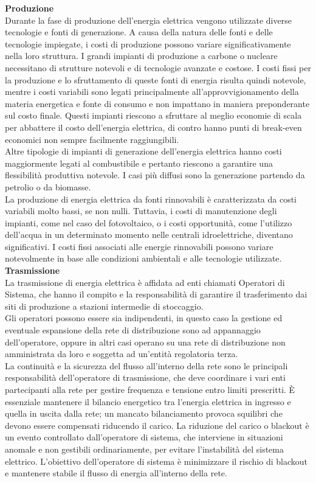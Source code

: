 \documentclass{article}
\begin{document}
\textbf{Produzione}\\
Durante la fase di produzione dell'energia elettrica vengono utilizzate diverse tecnologie e fonti di generazione. A causa della natura delle fonti e delle tecnologie impiegate, i costi di produzione possono variare significativamente nella loro struttura. I grandi impianti di produzione a carbone o nucleare necessitano di strutture notevoli e di tecnologie avanzate e costose. I costi fissi per la produzione e lo sfruttamento di queste fonti di energia risulta quindi notevole, mentre i costi variabili sono legati principalmente all’approvvigionamento della materia energetica e fonte di consumo e non impattano in maniera preponderante sul costo finale. Questi impianti riescono a sfruttare al meglio economie di scala per abbattere il costo dell’energia elettrica, di contro hanno punti di break-even economici non sempre facilmente raggiungibili.\\
Altre tipologie di impianti di generazione dell’energia elettrica hanno costi maggiormente legati al combustibile e pertanto riescono a garantire una flessibilità produttiva notevole. I casi più diffusi sono la generazione partendo da petrolio o da biomasse.\\
La produzione di energia elettrica da fonti rinnovabili è caratterizzata da costi variabili molto bassi, se non nulli. Tuttavia, i costi di manutenzione degli impianti, come nel caso del fotovoltaico, o i costi opportunità, come l'utilizzo dell'acqua in un determinato momento nelle centrali idroelettriche, diventano significativi. I costi fissi associati alle energie rinnovabili possono variare notevolmente in base alle condizioni ambientali e alle tecnologie utilizzate.\\
\textbf{Trasmissione}\\
La trasmissione di energia elettrica è affidata ad enti chiamati Operatori di Sistema, che hanno il compito e la responsabilità di garantire il trasferimento dai siti di produzione a stazioni intermedie di stoccaggio.\\
Gli operatori possono essere sia indipendenti, in questo caso la gestione ed eventuale espansione della rete di distribuzione sono ad appannaggio dell’operatore, oppure in altri casi operano su una rete di distribuzione non amministrata da loro e soggetta ad un’entità regolatoria terza.\\
La continuità e la sicurezza del flusso all'interno della rete sono le principali responsabilità dell'operatore di trasmissione, che deve coordinare i vari enti partecipanti alla rete per gestire frequenza e tensione entro limiti prescritti. È essenziale mantenere il bilancio energetico tra l'energia elettrica in ingresso e quella in uscita dalla rete; un mancato bilanciamento provoca squilibri che devono essere compensati riducendo il carico. La riduzione del carico o blackout è un evento controllato dall’operatore di sistema, che interviene in situazioni anomale e non gestibili ordinariamente, per evitare l'instabilità del sistema elettrico. L’obiettivo dell'operatore di sistema è minimizzare il rischio di blackout e mantenere stabile il flusso di energia all'interno della rete.\\
\end{document}
